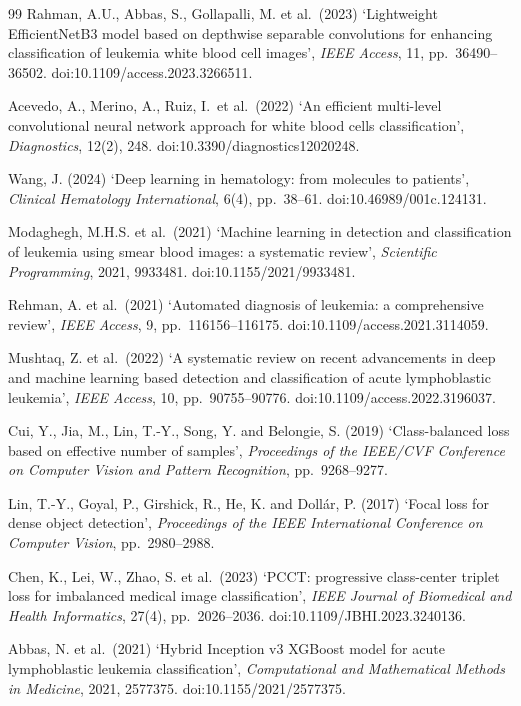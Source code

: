 \documentclass[11pt]{article}
\begin{document}
\begin{thebibliography}{99}
Rahman, A.U., Abbas, S., Gollapalli, M. et al.\ (2023)
`Lightweight EfficientNetB3 model based on depthwise separable convolutions for
enhancing classification of leukemia white blood cell images',
\emph{IEEE Access}, 11, pp.\ 36490--36502. doi:10.1109/access.2023.3266511.

Acevedo, A., Merino, A., Ruiz, I.\ et al.\ (2022)
`An efficient multi-level convolutional neural network approach for white blood
cells classification', \emph{Diagnostics}, 12(2), 248.
doi:10.3390/diagnostics12020248.

Wang, J. (2024) `Deep learning in hematology: from molecules to patients',
\emph{Clinical Hematology International}, 6(4), pp.\ 38--61.
doi:10.46989/001c.124131.

Modaghegh, M.H.S. et al.\ (2021)
`Machine learning in detection and classification of leukemia using smear blood
images: a systematic review', \emph{Scientific Programming}, 2021, 9933481.
doi:10.1155/2021/9933481.

Rehman, A. et al.\ (2021)
`Automated diagnosis of leukemia: a comprehensive review',
\emph{IEEE Access}, 9, pp.\ 116156--116175. doi:10.1109/access.2021.3114059.

Mushtaq, Z. et al.\ (2022)
`A systematic review on recent advancements in deep and machine learning based
detection and classification of acute lymphoblastic leukemia',
\emph{IEEE Access}, 10, pp.\ 90755--90776. doi:10.1109/access.2022.3196037.

Cui, Y., Jia, M., Lin, T.-Y., Song, Y. and Belongie, S. (2019)
`Class-balanced loss based on effective number of samples',
\emph{Proceedings of the IEEE/CVF Conference on Computer Vision and Pattern
Recognition}, pp.\ 9268--9277.

Lin, T.-Y., Goyal, P., Girshick, R., He, K. and Doll\'ar, P. (2017)
`Focal loss for dense object detection', \emph{Proceedings of the IEEE
International Conference on Computer Vision}, pp.\ 2980--2988.

Chen, K., Lei, W., Zhao, S. et al.\ (2023)
`PCCT: progressive class-center triplet loss for imbalanced medical image
classification', \emph{IEEE Journal of Biomedical and Health Informatics},
27(4), pp.\ 2026--2036. doi:10.1109/JBHI.2023.3240136.

Abbas, N. et al.\ (2021)
`Hybrid Inception v3 XGBoost model for acute lymphoblastic leukemia
classification', \emph{Computational and Mathematical Methods in Medicine},
2021, 2577375. doi:10.1155/2021/2577375.


\end{thebibliography}
\end{document}
